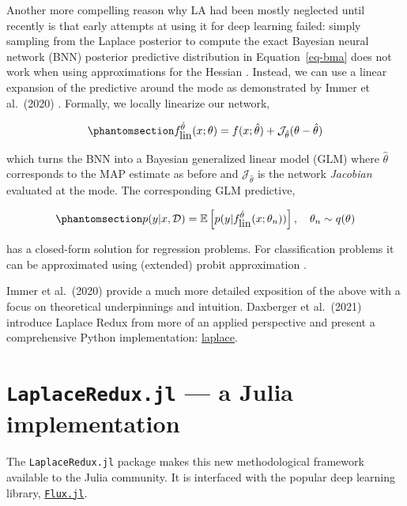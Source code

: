 \documentclass{juliacon}
\begin{document}
Another more compelling reason why LA had been mostly neglected until
recently is that early attempts at using it for deep learning failed:
simply sampling from the Laplace posterior to compute the exact Bayesian
neural network (BNN) posterior predictive distribution in
Equation~\ref{eq-bma} does not work when using approximations for the
Hessian \cite{lawrence2001variational}. Instead, we can use a linear
expansion of the predictive around the mode as demonstrated by Immer et
al.~(2020) \cite{immer2020improving}. Formally, we locally linearize our
network,

\begin{equation}\phantomsection\label{eq-glm}{
f^{\hat{\theta}}_{\mbox{lin}}(x;\theta)=f(x;\hat{\theta}) + \mathcal{J}_{\hat{\theta}}(\theta-\hat{\theta})
}\end{equation}

which turns the BNN into a Bayesian generalized linear model (GLM) where
\(\hat{\theta}\) corresponds to the MAP estimate as before and
\(\mathcal{J}_{\hat{\theta}}\) is the network \emph{Jacobian}
\cite{immer2020improving} evaluated at the mode. The corresponding GLM
predictive,

\begin{equation}\phantomsection\label{eq-glm-predictive}{
p(y|x,\mathcal{D}) = \mathbb{E} \left[ p(y|f^{\hat{\theta}}_{\mbox{lin}}(x;\theta_n)) \right], \ \ \ \theta_n \sim q(\theta)
}\end{equation}

has a closed-form solution for regression problems. For classification
problems it can be approximated using (extended) probit approximation
\cite{daxberger2021laplace}.

Immer et al.~(2020) \cite{immer2020improving} provide a much more
detailed exposition of the above with a focus on theoretical
underpinnings and intuition. Daxberger et al.~(2021)
\cite{daxberger2021laplace} introduce Laplace Redux from more of an
applied perspective and present a comprehensive Python implementation:
\href{https://aleximmer.github.io/Laplace/}{laplace}.

\section{\texorpdfstring{\texttt{LaplaceRedux.jl} --- a Julia
implementation}{LaplaceRedux.jl --- a Julia implementation}}\label{laplaceredux.jl-a-julia-implementation}

The \texttt{LaplaceRedux.jl} package makes this new methodological
framework available to the Julia community. It is interfaced with the
popular deep learning library,
\href{https://fluxml.ai/}{\texttt{Flux.jl}}.
\end{document}
